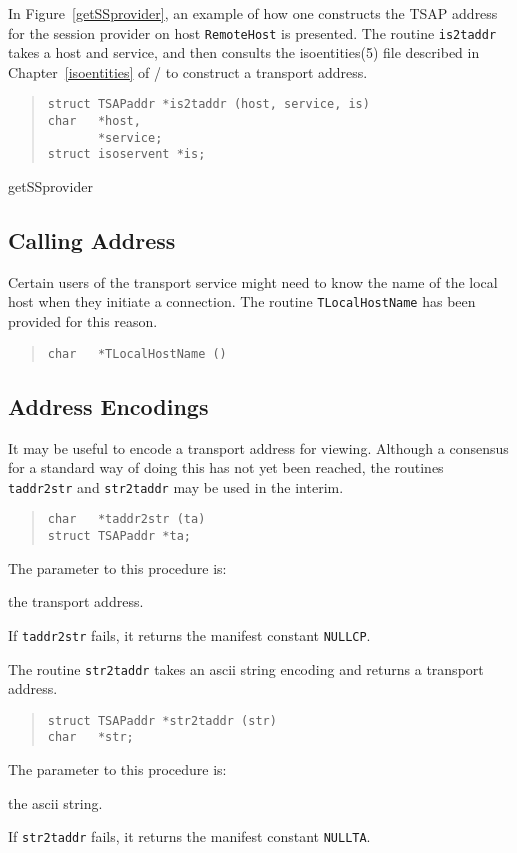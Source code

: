 In Figure~\ref{getSSprovider},
an example of how one constructs the TSAP address for the session provider on
host \verb"RemoteHost" is presented.
The routine \verb"is2taddr" takes a host and service,
and then consults the \man isoentities(5) file described in
Chapter~\ref{isoentities} of \volone/ to construct a transport
address.
\begin{quote}\small\begin{verbatim}
struct TSAPaddr *is2taddr (host, service, is)
char   *host,
       *service;
struct isoservent *is;
\end{verbatim}\end{quote}
%
	{getSSprovider}

\subsection	{Calling Address}
Certain users of the transport service
might need to know the name of the local host when they initiate a connection.
The routine \verb"TLocalHostName" has been provided for this reason.
\begin{quote}\small\begin{verbatim}
char   *TLocalHostName ()
\end{verbatim}\end{quote}

\subsection	{Address Encodings}
It may be useful to encode a transport address for viewing.
Although a consensus for a standard way of doing this has not yet been
reached,
the routines \verb"taddr2str" and \verb"str2taddr" may be used in the interim.
\begin{quote}\small\begin{verbatim}
char   *taddr2str (ta)
struct TSAPaddr *ta;
\end{verbatim}\end{quote}
The parameter to this procedure is:
\begin{describe}
\item[\verb"ta":] the transport address.
\end{describe}
If \verb"taddr2str" fails,
it returns the manifest constant \verb"NULLCP".

The routine \verb"str2taddr" takes an ascii string encoding and
returns a
transport address.
\begin{quote}\small\begin{verbatim}
struct TSAPaddr *str2taddr (str)
char   *str;
\end{verbatim}\end{quote}
The parameter to this procedure is:
\begin{describe}
\item[\verb"str":] the ascii string.
\end{describe}
If \verb"str2taddr" fails,
it returns the manifest constant \verb"NULLTA".

